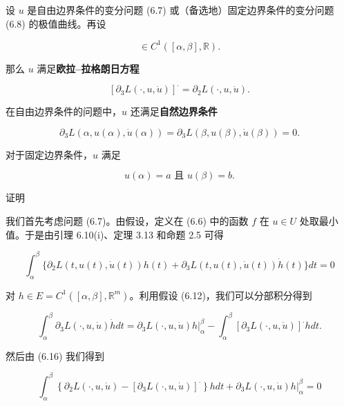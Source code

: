 \begin{theorem}

设 $ u $ 是自由边界条件的变分问题 (6.7) 或（备选地）固定边界条件的变分问题 (6.8) 的极值曲线。再设

\begin{equation}
[t \mapsto \partial_{3}L(t, u(t), \dot{u}(t))] \in C^{1}([\alpha, \beta], \mathbb{R}) .\tag{6.12}
\end{equation}

那么 $ u $ 满足\textbf{欧拉–拉格朗日方程}

\begin{equation}
\left[\partial_{3}L(\cdot, u, \dot{u})\right]^{\cdot} = \partial_{2}L(\cdot, u, \dot{u}) .\tag{6.13}
\end{equation}

在自由边界条件的问题中，$ u $ 还满足\textbf{自然边界条件}

\begin{equation}
\partial_{3}L(\alpha, u(\alpha), \dot{u}(\alpha)) = \partial_{3}L(\beta, u(\beta), \dot{u}(\beta)) = 0 .\tag{6.14}
\end{equation}

对于固定边界条件，$ u $ 满足

\begin{equation}
u(\alpha) = a \text{ 且 } u(\beta) = b .\tag{6.15}
\end{equation}

证明

\begin{subitems}
\item

我们首先考虑问题 (6.7)。由假设，定义在 (6.6) 中的函数 $ f $ 在 $ u \in U $ 处取最小值。于是由引理 6.10(i)、定理 3.13 和命题 2.5 可得

\begin{equation}
\int_{\alpha}^{\beta}\{\partial_{2}L(t, u(t), \dot{u}(t))h(t) + \partial_{3}L(t, u(t), \dot{u}(t))\dot{h}(t)\} dt = 0\tag{6.16}
\end{equation}

对 $ h \in E = C^{1}([\alpha, \beta], \mathbb{R}^{m}) $。利用假设 (6.12)，我们可以分部积分得到

\[
\int_{\alpha}^{\beta}\partial_{3}L(\cdot, u, \dot{u})\dot{h} dt = \partial_{3}L(\cdot, u, \dot{u})h\big|_{\alpha}^{\beta} - \int_{\alpha}^{\beta}\left[\partial_{3}L(\cdot, u, \dot{u})\right]^{\cdot}h dt .
\]

然后由 (6.16) 我们得到

\begin{equation}
\int_{\alpha}^{\beta}\left\{\partial_{2}L(\cdot, u, \dot{u}) - \left[\partial_{3}L(\cdot, u, \dot{u})\right]^{\cdot}\right\}h dt + \partial_{3}L(\cdot, u, \dot{u})h\big|_{\alpha}^{\beta} = 0\tag{6.17}
\end{equation}


\end{subitems}
\end{theorem}
